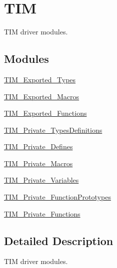 \hypertarget{group___t_i_m}{}\section{T\+IM}
\label{group___t_i_m}


T\+IM driver modules.  


\subsection*{Modules}
\begin{DoxyCompactItemize}
\item 
\hyperlink{group___t_i_m___exported___types}{T\+I\+M\+\_\+\+Exported\+\_\+\+Types}
\item 
\hyperlink{group___t_i_m___exported___macros}{T\+I\+M\+\_\+\+Exported\+\_\+\+Macros}
\item 
\hyperlink{group___t_i_m___exported___functions}{T\+I\+M\+\_\+\+Exported\+\_\+\+Functions}
\item 
\hyperlink{group___t_i_m___private___types_definitions}{T\+I\+M\+\_\+\+Private\+\_\+\+Types\+Definitions}
\item 
\hyperlink{group___t_i_m___private___defines}{T\+I\+M\+\_\+\+Private\+\_\+\+Defines}
\item 
\hyperlink{group___t_i_m___private___macros}{T\+I\+M\+\_\+\+Private\+\_\+\+Macros}
\item 
\hyperlink{group___t_i_m___private___variables}{T\+I\+M\+\_\+\+Private\+\_\+\+Variables}
\item 
\hyperlink{group___t_i_m___private___function_prototypes}{T\+I\+M\+\_\+\+Private\+\_\+\+Function\+Prototypes}
\item 
\hyperlink{group___t_i_m___private___functions}{T\+I\+M\+\_\+\+Private\+\_\+\+Functions}
\end{DoxyCompactItemize}


\subsection{Detailed Description}
T\+IM driver modules. 

